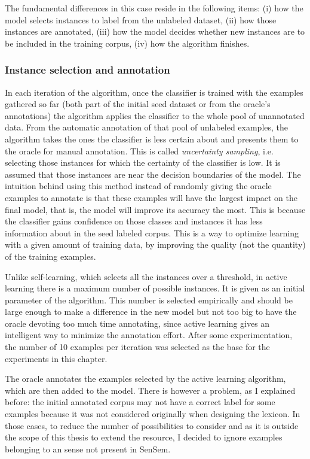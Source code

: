 The fundamental differences in this case reside in the following items: (i) how
the model selects instances to label from the unlabeled dataset, (ii) how those
instances are annotated, (iii) how the model decides whether new instances are
to be included in the training corpus, (iv) how the algorithm finishes.

\subsubsection{Instance selection and annotation}

In each iteration of the algorithm, once the classifier is trained with the
examples gathered so far (both part of the initial seed dataset or from the
oracle's annotations) the algorithm applies the classifier to the whole pool of
unannotated data. From the automatic annotation of that pool of unlabeled
examples, the algorithm takes the ones the classifier is less certain about and
presents them to the oracle for manual annotation. This is called {\em
uncertainty sampling}, i.e. selecting those instances for which the certainty
of the classifier is low. It is assumed that those instances are near the
decision boundaries of the model. The intuition behind using this method
instead of randomly giving the oracle examples to annotate is that these
examples will have the largest impact on the final model, that is, the model
will improve its accuracy the most. This is because the classifier gains
confidence on those classes and instances it has less information about in the
seed labeled corpus. This is a way to optimize learning with a given amount of
training data, by improving the quality (not the quantity) of the training
examples.

Unlike self-learning, which selects all the instances over a threshold, in
active learning there is a maximum number of possible instances. It is given as
an initial parameter of the algorithm. This number is selected empirically and
should be large enough to make a difference in the new model but not too big to
have the oracle devoting too much time annotating, since active learning gives
an intelligent way to minimize the annotation effort. After some
experimentation, the number of 10 examples per iteration was selected as the
base for the experiments in this chapter.

The oracle annotates the examples selected by the active learning algorithm,
which are then added to the model. There is however a problem, as I explained
before: the initial annotated corpus may not have a correct label for some
examples because it was not considered originally when designing the lexicon.
In those cases, to reduce the number of possibilities to consider and as it is
outside the scope of this thesis to extend the resource, I decided to ignore
examples belonging to an sense not present in SenSem.

